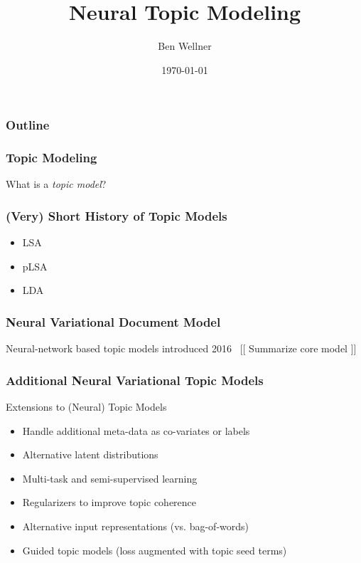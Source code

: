 \documentclass{beamer}
\title{Neural Topic Modeling}
\author{Ben Wellner}
\institute{MITRE}
\date{\today}
\begin{document}
\begin{frame}
\frametitle{Outline}
\tableofcontents
\end{frame}

\begin{frame}
  \frametitle{Topic Modeling}
  What is a \emph{topic model}?
  
\end{frame}

\begin{frame}
  \frametitle{(Very) Short History of Topic Models}
  \begin{itemize}
  \item LSA
  \item pLSA
  \item LDA
  \end{itemize}
  
\end{frame}

\begin{frame}
  \frametitle{Neural Variational Document Model}
  Neural-network based topic models introduced 2016~\cite{pmlr-v48-miao16}
  [[ Summarize core model ]]
\end{frame}

\begin{frame}
  \frametitle{Additional Neural Variational Topic Models}
\end{frame}

\begin{frame}{Extensions to (Neural) Topic Models}
  \begin{itemize}
  \item Handle additional meta-data as co-variates or labels
  \item Alternative latent distributions
  \item Multi-task and semi-supervised learning 
  \item Regularizers to improve topic coherence
  \item Alternative input representations (vs. bag-of-words)
  \item Guided topic models (loss augmented with topic seed terms)
  \end{itemize}
\end{frame}
\end{document}
